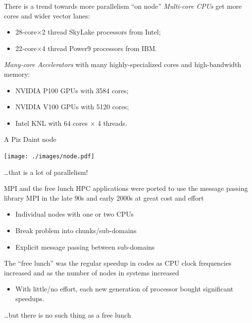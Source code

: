 \documentclass[aspectratio=43]{beamer}
\begin{document}

\begin{frame}[fragile]{}
    \begin{info}{There is a trend towards more parallelism ``on node''}
        \emph{Multi-core CPUs} get more cores and wider vector lanes:
        \begin{itemize}
            \item 28-core$\times$2 thread SkyLake processors from Intel;
            \item 22-core$\times$4 thread Power9 processors from IBM.
        \end{itemize}
        \emph{Many-core Accelerators} with many highly-specialized cores and high-bandwidth memory:
        \begin{itemize}
            \item NVIDIA P100 GPUs with 3584 cores;
            \item NVIDIA V100 GPUs with 5120 cores;
            \item Intel KNL with 64 cores $\times$ 4 threads.
        \end{itemize}
    \end{info}

\end{frame}

\begin{frame}[fragile]{A Piz Daint node}
    \begin{center}
        \texttt{[image: ./images/node.pdf]}
    \end{center}
    \dots that is a lot of parallelism!
\end{frame}


\begin{frame}[fragile]{MPI and the free lunch}
    HPC applications were ported to use the message passing library MPI in the late 90s and early 2000s at great cost and effort
    \begin{itemize}
        \item Individual nodes with one or two CPUs
        \item Break problem into chunks/sub-domains
        \item Explicit message passing between sub-domains
    \end{itemize}
    The ``free lunch'' was the regular speedup in codes as CPU clock frequencies increased and as the number of nodes in systems increased
    \begin{itemize}
        \item With little/no effort, each new generation of processor bought significant speedups.
    \end{itemize}

    \dots  but there is no such thing as a free lunch
\end{frame}
\end{document}
